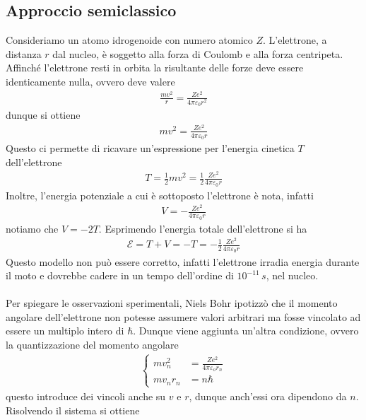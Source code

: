 \documentclass{article}
\begin{document}
\subsection{Approccio semiclassico}
Consideriamo un atomo idrogenoide con numero atomico $Z$. L'elettrone, a distanza $r$ dal nucleo, è soggetto alla forza di Coulomb e alla forza centripeta. Affinché l'elettrone resti in orbita la risultante delle forze deve essere identicamente nulla, ovvero deve valere
\begin{gather}
    \frac{mv^2}{r} = \frac{Ze^2}{4\pi\varepsilon_0r^2} \tag{1.1.1}
\end{gather}
dunque si ottiene
\begin{gather}
    mv^2 = \frac{Ze^2}{4\pi\varepsilon_0r} \tag{1.1.2}
\end{gather}
Questo ci permette di ricavare un'espressione per l'energia cinetica $T$ dell'elettrone
\begin{gather}
    T = \frac{1}{2}mv^2 = \frac{1}{2}\frac{Ze^2}{4\pi\varepsilon_0r} \tag{1.1.3}
\end{gather}
Inoltre, l'energia potenziale a cui è sottoposto l'elettrone è nota, infatti
\begin{gather}
    V = -\frac{Ze^2}{4\pi\varepsilon_0r} \tag{1.1.4}
\end{gather}
notiamo che $V = -2T$. Esprimendo l'energia totale dell'elettrone si ha
\begin{gather}
    \mathcal{E} = T + V = -T = -\frac{1}{2}\frac{Ze^2}{4\pi\varepsilon_0r} \tag{1.1.5}
\end{gather}
Questo modello non può essere corretto, infatti l'elettrone irradia energia durante il moto e dovrebbe cadere in un tempo dell'ordine di $10^{-11} \, s$, nel nucleo. \\ \\
Per spiegare le osservazioni sperimentali, Niels Bohr ipotizzò che il momento angolare dell'elettrone non potesse assumere valori arbitrari ma fosse vincolato ad essere un multiplo intero di $\hbar$. Dunque viene aggiunta un'altra condizione, ovvero la quantizzazione del momento angolare
\begin{gather}
    \begin{cases}
        mv^2_n &= \frac{Ze^2}{4\pi\varepsilon_or_n} \\
        mv_nr_n &= n\hbar
    \end{cases} \tag{1.1.6}
\end{gather}
questo introduce dei vincoli anche su $v$ e $r$, dunque anch'essi ora dipendono da $n$. Risolvendo il sistema si ottiene
\end{document}
